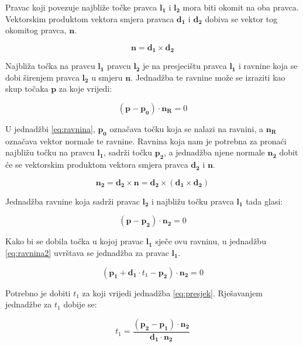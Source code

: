 \documentclass[times, utf8, diplomski]{fer}
\begin{document}
Pravac koji povezuje najbliže točke pravca $\bm{l_1}$ i $\bm{l_2}$ mora biti okomit na oba pravca. Vektorskim produktom vektora smjera pravaca $\bm{d_1}$ i $\bm{d_2}$ dobiva se vektor tog okomitog pravca, $\bm{n}$.

\begin{equation}
\bm{n} = \bm{d_1} \times \bm{d_2}
\end{equation}

Najbliža točka na pravcu $\bm{l_1}$ pravcu $\bm{l_2}$ je na presjecištu pravca $\bm{l_1}$ i ravnine koja se dobi širenjem pravca $\bm{l_2}$ u smjeru $\bm{n}$. Jednadžba te ravnine može se izraziti kao skup točaka $\bm{p}$ za koje vrijedi:

\begin{equation}
(\bm{p} - \bm{p_0})\cdot\bm{n_R} = 0
\label{eq:ravnina}
\end{equation}

U jednadžbi \ref{eq:ravnina}, $\bm{p_0}$ označava točku koja se nalazi na ravnini, a $\bm{n_R}$ označava vektor normale te ravnine. Ravnina koja nam je potrebna za pronaći najbližu točku na pravcu $\bm{l_1}$, sadrži točku $\bm{p_2}$, a jednadžba njene normale $\bm{n_2}$ dobit će se vektorskim produktom vektora smjera pravca $\bm{d_2}$ i $\bm{n}$.

\begin{equation}
\bm{n_2} = \bm{d_2} \times \bm{n} = \bm{d_2} \times (\bm{d_1} \times \bm{d_2})
\end{equation}

Jednadžba ravnine koja sadrži pravac $\bm{l_2}$ i najbližu točku pravca $\bm{l_1}$ tada glasi:

\begin{equation}
(\bm{p} - \bm{p_2})\cdot \bm{n_2} = 0
\label{eq:ravnina2}
\end{equation}

Kako bi se dobila točka u kojoj pravac $\bm{l_1}$ sječe ovu ravninu, u jednadžbu \ref{eq:ravnina2} uvrštava se jednadžba za pravac $\bm{l_1}$.

\begin{equation}
(\bm{p_1} + \bm{d_1}\cdot t_1 - \bm{p_2})\cdot \bm{n_2} = 0
\label{eq:presjek}
\end{equation}

Potrebno je dobiti $t_1$ za koji vrijedi jednadžba \ref{eq:presjek}. Rješavanjem jednadžbe za $t_1$ dobije se:

\begin{equation}
t_1 = \frac{(\bm{p_2} - \bm{p_1})\cdot \bm{n_2}}{\bm{d_1}\cdot\bm{n_2}}
\end{equation}
\end{document}
